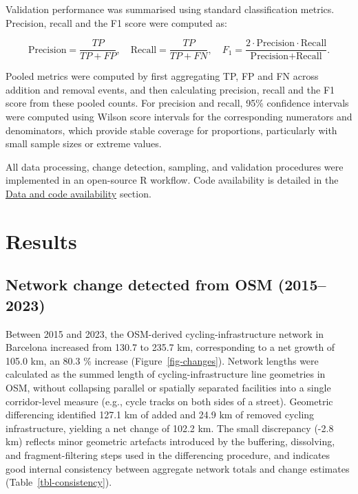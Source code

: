 \documentclass[
]{article}
\begin{document}
Validation performance was summarised using standard classification
metrics. Precision, recall and the F1 score were computed as:

\[\text{Precision}=\frac{TP}{TP+FP},\quad
\text{Recall}=\frac{TP}{TP+FN},\quad
F_1=\frac{2\cdot \text{Precision}\cdot \text{Recall}}{\text{Precision}+\text{Recall}}.\]

Pooled metrics were computed by first aggregating TP, FP and FN across
addition and removal events, and then calculating precision, recall and
the F1 score from these pooled counts. For precision and recall, 95\%
confidence intervals were computed using Wilson score intervals for the
corresponding numerators and denominators, which provide stable coverage
for proportions, particularly with small sample sizes or extreme values.

All data processing, change detection, sampling, and validation
procedures were implemented in an open-source R workflow. Code
availability is detailed in the \hyperref[s1-code]{Data and code
availability} section.

\section{Results}\label{results}

\subsection{Network change detected from OSM
(2015--2023)}\label{sec-network-change}

Between 2015 and 2023, the OSM-derived cycling-infrastructure network in
Barcelona increased from 130.7 to 235.7 km, corresponding to a net
growth of 105.0 km, an 80.3 \% increase (Figure~\ref{fig-changes}).
Network lengths were calculated as the summed length of
cycling-infrastructure line geometries in OSM, without collapsing
parallel or spatially separated facilities into a single corridor-level
measure (e.g., cycle tracks on both sides of a street). Geometric
differencing identified 127.1 km of added and 24.9 km of removed cycling
infrastructure, yielding a net change of 102.2 km. The small discrepancy
(-2.8 km) reflects minor geometric artefacts introduced by the
buffering, dissolving, and fragment-filtering steps used in the
differencing procedure, and indicates good internal consistency between
aggregate network totals and change estimates
(Table~\ref{tbl-consistency}).
\end{document}
